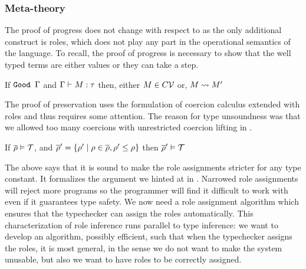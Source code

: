 \documentclass[screen,nonacm,manuscript,review]{acmart} %
\begin{document}
\subsubsection{Meta-theory}\label{sec:sfr-metatheory}
The proof of progress does not change with respect to \SFC as the only additional construct is roles, which does not play any part in the operational semantics of the language. To recall, the proof of progress is necessary to show that the well typed terms are either values or they can take a step.

\begin{theorem}\label{lem:sfr-progress}
 If $\texttt{Good~}\Gamma$ and $\Gamma \vdash M : \tau$ then, either $M \in C\mathcal{V}$ or, $M \rightsquigarrow M'$
\end{theorem}

The proof of preservation uses the formulation of coercion calculus extended with roles and thus requires some attention. The reason for type unsoundness was that we allowed too many coercions with unrestricted coercion lifting in \SFC.

\begin{lemma}\label{lem:role-narrowing}
If $\overline{\rho} \mathrel{\vDash} \mathcal{T}$, and $\overline{\rho}' = \{\rho' \mid \rho \in \overline{\rho}, \rho' \leq \rho\}$ then $\overline{\rho}' \mathrel{\vDash} \mathcal{T}$
\end{lemma}

The above  says that it is sound to make the role assignments stricter for any type constant. It formalizes the argument we hinted at in . Narrowed role assignments will reject more programs so the programmer will find it difficult to work with even if it guarantees type safety.
We now need a role assignment algorithm which ensures that the typechecker can assign the roles automatically. This characterization of role inference runs parallel to type inference: we want to develop an algorithm, possibly efficient, such that when the typechecker assigns the roles, it is most general, in the sense we do not want to make the system unusable, but also we want to have roles to be correctly assigned.
\end{document}
